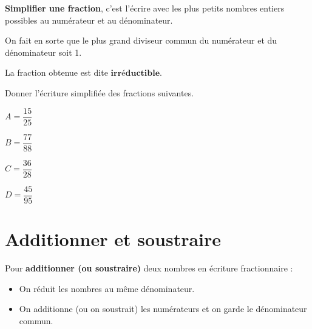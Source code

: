 \documentclass[a4paper]{book}
\begin{document}
    
    \begin{definition} 
        \textbf{Simplifier une fraction}, c'est l'écrire avec les plus petits nombres entiers possibles au numérateur et au dénominateur. 
        
        On fait en sorte que le plus grand diviseur commun du numérateur et du dénominateur soit 1.

        La fraction obtenue est dite $\textbf{irréductible}$.
    \end{definition}


    \begin{exemple}
        Donner l'écriture simplifiée des fractions suivantes.

        \begin{minipage}{0.24\linewidth}
            $A=\dfrac{15}{25}$

            \vspace{1cm}
        \end{minipage}
        \hfill\vline\hfill
        \begin{minipage}{0.24\linewidth}
            $B=\dfrac{77}{88}$

            \vspace{1cm}
        \end{minipage}
        \hfill\vline\hfill
        \begin{minipage}{0.24\linewidth}
            $C=\dfrac{36}{28}$

            \vspace{1cm}
        \end{minipage}
        \hfill\vline\hfill
        \begin{minipage}{0.24\linewidth}
            $D=\dfrac{45}{95}$

            \vspace{1cm}
        \end{minipage}
    \end{exemple}
    
    
    \section{Additionner et soustraire}
    
    \begin{definition}
        Pour \textbf{additionner (ou soustraire)} deux nombres en écriture fractionnaire :
        \begin{itemize}
            \item On réduit les nombres au même dénominateur.
            \item On additionne (ou on soustrait) les numérateurs et on garde le dénominateur commun.
        \end{itemize}
    \end{definition}
    
\end{document}
